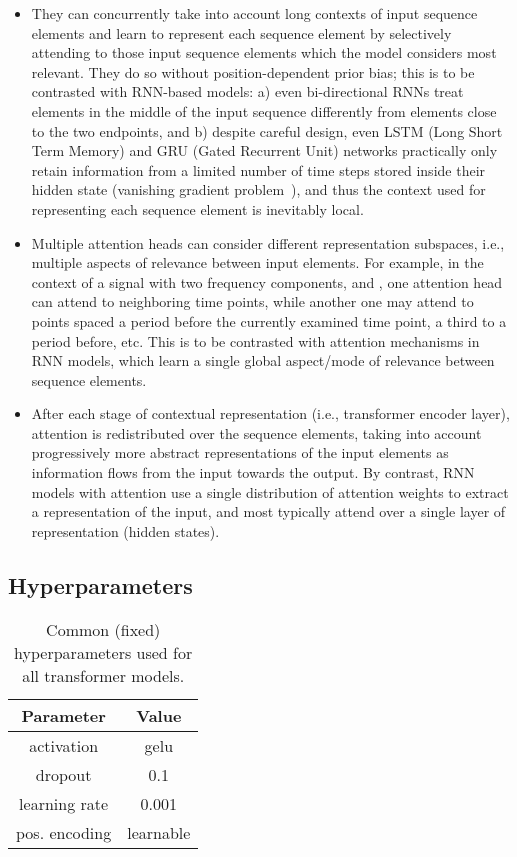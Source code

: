 \documentclass{article} \usepackage{iclr2021_conference,times}
\begin{document}
\begin{itemize}
    \item They can concurrently take into account long contexts of input sequence elements and learn to represent each sequence element by selectively attending to those input sequence elements which the model considers most relevant. They do so without position-dependent prior bias; this is to be contrasted with RNN-based models: a) even bi-directional RNNs treat elements in the middle of the input sequence differently from elements close to the two endpoints, and b) despite careful design, even LSTM (Long Short Term Memory) and GRU (Gated Recurrent Unit) networks practically only retain information from a limited number of time steps stored inside their hidden state (vanishing gradient problem~\citep{hochreiter_vanishing_1998, pascanu_difficulty_2013}), and thus the context used for representing each sequence element is inevitably local.
    
    \item Multiple attention heads can consider different representation subspaces, i.e., multiple aspects of relevance between input elements. For example, in the context of a signal with two frequency components,  and  , one attention head can attend to neighboring time points, while another one may attend to points spaced a period  before the currently examined time point, a third to a period  before, etc. This is to be contrasted with attention mechanisms in RNN models, which learn a single global aspect/mode of relevance between sequence elements.
    
    \item After each stage of contextual representation (i.e., transformer encoder layer), attention is redistributed over the sequence elements, taking into account progressively more abstract representations of the input elements as information flows from the input towards the output. By contrast, RNN models with attention use a single distribution of attention weights to extract a representation of the input, and most typically attend over a single layer of representation (hidden states).

\end{itemize}

\subsection{Hyperparameters}

\begin{table}
\centering
\begin{tabular}{|c|c|} 
\hline
\textbf{Parameter}   & \textbf{Value}  \\ 
\hline
activation       & gelu            \\
dropout          & 0.1             \\
learning rate               & 0.001           \\
pos. encoding    & learnable       \\
\hline
\end{tabular}
\caption{Common (fixed) hyperparameters used for all transformer models.}
\label{basic_config}
\end{table}
\end{document}
